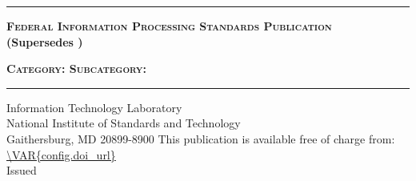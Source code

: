 \documentclass[12pt]{article}
\begin{document}
    \RaggedRight %


\begin{titlepage}


\sffamily

\LARGE{\textbf{}}
\vspace{8pt}
\hrule
\vspace{8pt}
\large{\textbf{\textsc{Federal Information Processing Standards Publication}}}\\
\small{\textbf{(Supersedes )}}

\vfill
\huge{\textbf{}}
\vfill
\normalsize{\textbf{\textsc{Category: 
\hfill Subcategory: 
}}}
\vspace{8pt}
\hrule
\vfill

Information Technology Laboratory\\
National Institute of Standards and Technology\\
Gaithersburg, MD 20899-8900
\vfill
\normalsize This publication is available free of charge from:\\
\url{\VAR{config.doi_url}}\\
\vfill
\normalsize Issued 
\vfill


\end{titlepage}
\end{document}

